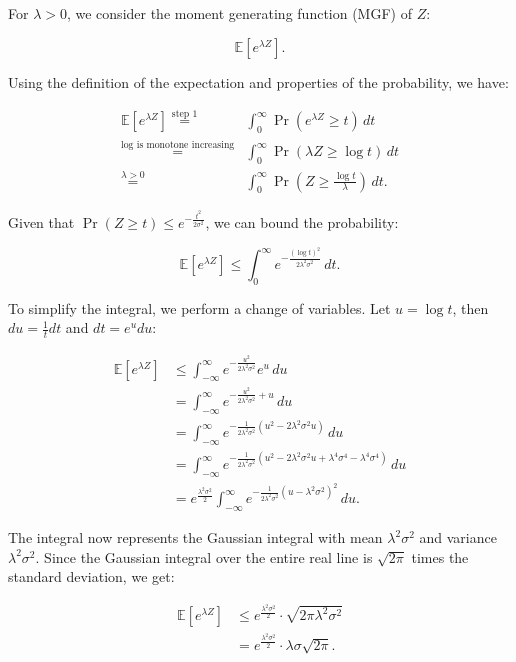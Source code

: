 \documentclass[a4 paper]{article}
\theoremstyle{boldStyle}
\theoremstyle{boldBlueStyle}
\theoremstyle{boldPurpleStyle}
\theoremstyle{boldRedStyle}
\begin{document}
For \(\lambda > 0\), we consider the moment generating function (MGF) of \(Z\):

\[
\mathbb{E}[e^{\lambda Z}].
\]

Using the definition of the expectation and properties of the probability, we have:

\begin{align*}
\mathbb{E}[e^{\lambda Z}] \stackrel{\text{step 1}}{=} &\int_0^\infty \Pr(e^{\lambda Z} \geq t) \, dt \\
\stackrel{\text{log is monotone increasing}}{=} &\int_0^\infty \Pr(\lambda Z \geq \log t) \, dt \\
\stackrel{\lambda > 0}{=} &\int_0^\infty \Pr\left(Z \geq \frac{\log t}{\lambda}\right) \, dt.
\end{align*}

Given that \(\Pr(Z \geq t) \leq e^{-\frac{t^2}{2\sigma^2}}\), we can bound the probability:

\[
\mathbb{E}[e^{\lambda Z}] \leq \int_0^\infty e^{-\frac{(\log t)^2}{2\lambda^2 \sigma^2}} \, dt.
\]

To simplify the integral, we perform a change of variables. Let \(u = \log t\), then \(du = \frac{1}{t} dt\) and \(dt = e^u du\):

\begin{align*}
\mathbb{E}[e^{\lambda Z}] &\leq \int_{-\infty}^{\infty} e^{-\frac{u^2}{2\lambda^2 \sigma^2}} e^u \, du \\
&= \int_{-\infty}^{\infty} e^{-\frac{u^2}{2\lambda^2 \sigma^2} + u} \, du \\
&= \int_{-\infty}^{\infty} e^{-\frac{1}{2\lambda^2 \sigma^2}(u^2 - 2\lambda^2 \sigma^2 u)} \, du \\
&= \int_{-\infty}^{\infty} e^{-\frac{1}{2\lambda^2 \sigma^2}\left(u^2 - 2\lambda^2 \sigma^2 u + \lambda^4 \sigma^4 - \lambda^4 \sigma^4\right)} \, du \\
&= e^{\frac{\lambda^2 \sigma^2}{2}} \int_{-\infty}^{\infty} e^{-\frac{1}{2\lambda^2 \sigma^2}(u - \lambda^2 \sigma^2)^2} \, du.
\end{align*}

The integral now represents the Gaussian integral with mean \(\lambda^2 \sigma^2\) and variance \(\lambda^2 \sigma^2\). 
Since the Gaussian integral over the entire real line is \(\sqrt{2\pi}\) times the standard deviation, we get:

\begin{align*}
\mathbb{E}[e^{\lambda Z}] &\leq e^{\frac{\lambda^2 \sigma^2}{2}} \cdot \sqrt{2\pi \lambda^2 \sigma^2} \\
&= e^{\frac{\lambda^2 \sigma^2}{2}} \cdot \lambda \sigma \sqrt{2\pi}.
\end{align*}
\end{document}
